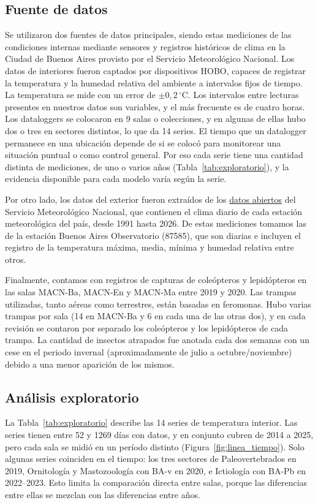 \documentclass[11pt,a4paper]{article}
\begin{document}
\subsection{Fuente de datos}
Se utilizaron dos fuentes de datos principales, siendo estas mediciones de las condiciones internas mediante sensores y registros históricos de clima en la Ciudad de Buenos Aires provisto por el Servicio Meteorológico Nacional.
Los datos de interiores fueron captados por dispositivos HOBO, capaces de registrar la temperatura y la humedad relativa del ambiente a intervalos fijos de tiempo. La temperatura se mide con un error de $\pm 0{,}2\,^\circ$C. Los intervalos entre lecturas presentes en nuestros datos son variables, y el más frecuente es de cuatro horas.
Los dataloggers se colocaron en 9 salas o colecciones, y en algunas de ellas hubo dos o tres en sectores distintos, lo que da 14 series. El tiempo que un datalogger permanece en una ubicación depende de si se colocó para monitorear una situación puntual o como control general. Por eso cada serie tiene una cantidad distinta de mediciones, de uno o varios años (Tabla~\ref{tab:exploratorio}), y la evidencia disponible para cada modelo varía según la serie.


Por otro lado, los datos del exterior fueron extraídos de los \href{https://www.smn.gob.ar/descarga-de-datos}{datos abiertos} del Servicio Meteorológico Nacional, que contienen el clima diario de cada estación meteorológica del país, desde 1991 hasta 2026. De estas mediciones tomamos las de la estación Buenos Aires Observatorio (87585), que son diarias e incluyen el registro de la temperatura máxima, media, mínima y humedad relativa entre otros. 

Finalmente, contamos con registros de capturas de coleópteros y lepidópteros en las salas MACN-Ba, MACN-En y MACN-Ma entre 2019 y 2020. Las trampas utilizadas, tanto aéreas como terrestres, están basadas en feromonas. Hubo varias trampas por sala (14 en MACN-Ba y 6 en cada una de las otras dos), y en cada revisión se contaron por separado los coleópteros y los lepidópteros de cada trampa. La cantidad de insectos atrapados fue anotada cada dos semanas con un cese en el periodo invernal (aproximadamente de julio a octubre/noviembre) debido a una menor aparición de los mismos.

\subsection{Análisis exploratorio}
\label{sec:exploratorio}
La Tabla~\ref{tab:exploratorio} describe las 14 series de temperatura interior. Las series tienen entre 52 y 1269 días con datos, y en conjunto cubren de 2014 a 2025, pero cada sala se midió en un período distinto (Figura~\ref{fig:linea_tiempo}). Solo algunas series coinciden en el tiempo: los tres sectores de Paleovertebrados en 2019, Ornitología y Mastozoología con BA-v en 2020, e Ictiología con BA-Pb en 2022--2023. Esto limita la comparación directa entre salas, porque las diferencias entre ellas se mezclan con las diferencias entre años.
\end{document}
